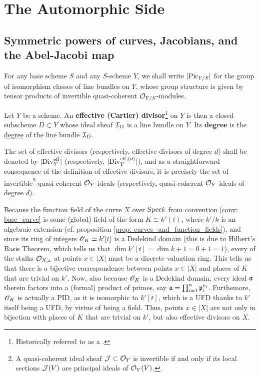\section{The Automorphic Side}
    \subsection{Symmetric powers of curves, Jacobians, and the Abel-Jacobi map}
        \begin{convention} \label{conv: picard_group}
            For any base scheme $S$ and any $S$-scheme $Y$, we shall write $|\mathrm{Pic}_{Y/S}|$ for the group of isomorphism classes of line bundles on $Y$, whose group structure is given by tensor products of invertible quasi-coherent $\mathcal{O}_{Y/S}$-modules.
        \end{convention}
        \begin{definition}[Divisors] \label{def: divisors}
            Let $Y$ be a scheme. An \textbf{effective (Cartier) divisor}\footnote{Historically referred to as a .} on $Y$ is then a closed subscheme $D \subset Y$ whose ideal sheaf $\mathcal{I}_D$ is a line bundle on $Y$. Its \textbf{degree} is the \href{https://stacks.math.columbia.edu/tag/0AYQ}{\underline{degree}} of the line bundle $\mathcal{I}_D$.  
                
            The set of effective divisors (respectively, effective divisors of degree $d$) shall be denoted by $|\mathrm{Div}_Y^{\mathrm{eff}}|$ (respectively, $|\mathrm{Div}_Y^{\mathrm{eff}, (d)}|$), and as a straightforward consequence of the definition of effective divisors, it is precisely the set of invertible\footnote{A quasi-coherent ideal sheaf $\mathcal{J} \subset \mathcal{O}_Y$ is invertible if and only if its local sections $\mathcal{J}(V)$ are principal ideals of $\mathcal{O}_Y(V)$.} quasi-coherent $\mathcal{O}_Y$-ideals (respectively, quasi-coherent $\mathcal{O}_Y$-ideals of degree $d$).
        \end{definition}
        \begin{remark} 
            Because the function field of the curve $X$ over $\mathrm{Spec} k$ from convention \ref{conv: base_curve} is some (global) field of the form $K \cong k'(t)$, where $k'/k$ is an algebraic extension (cf. proposition \ref{prop: curves_and_function_fields}), and since its ring of integers $\mathscr{O}_K \simeq k'[t]$ is a Dedekind domain (this is due to Hilbert's Basis Theorem, which tells us that $\dim k'[t] = \dim k + 1 = 0 + 1 = 1$), every of the stalks $\mathcal{O}_{X, x}$ at points $x \in |X|$ must be a discrete valuation ring. This tells us that there is a bijective correspondence between points $x \in |X|$ and places of $K$ that are trivial on $k'$. Now, also because $\mathscr{O}_K$ is a Dedekind domain, every ideal $\mathfrak{a}$ therein factors into a (formal) product of primes, say $\mathfrak{a} = \prod_{i = 1}^n \mathfrak{p}_i^{e_i}$. Furthemore, $\mathscr{O}_K$ is actually a PID, as it is isomorphic to $k'[t]$, which is a UFD thanks to $k'$ itself being a UFD, by virtue of being a field. Thus, points $x \in |X|$ are not only in bijection with places of $K$ that are trivial on $k'$, but also effective divisors on $X$.
        \end{remark}
        
